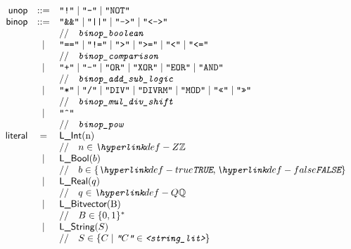 \documentclass{book}
\begin{document}
\[
\begin{array}{rcl}
\unop &::=& \texttt{"!"} \;|\; \texttt{"-"} \;|\; \texttt{"NOT"} \\
\binop &::=& \texttt{"\&\&"} \;|\; \texttt{"||"} \;|\; \texttt{"-->"} \;|\;  \texttt{"<->"}  \\
 & & \ASTComment{\texttt{binop\_boolean}}\\

 &|& \texttt{"=="} \;|\; \texttt{"!="}  \;|\; \texttt{">"}  \;|\; \texttt{">="} \;|\; \texttt{"<"} \;|\; \texttt{"<="}   \\
 & & \ASTComment{\texttt{binop\_comparison}}\\

 &|& \texttt{"+"} \;|\; \texttt{"-"}  \;|\; \texttt{"OR"}  \;|\; \texttt{"XOR"} \;|\; \texttt{"EOR"} \;|\; \texttt{"AND"}   \\
 & & \ASTComment{\texttt{binop\_add\_sub\_logic}}\\

 &|& \texttt{"*"} \;|\; \texttt{"/"}  \;|\; \texttt{"DIV"}  \;|\; \texttt{"DIVRM"} \;|\; \texttt{"MOD"}  \;|\; \texttt{"<<"}  \;|\; \texttt{">>"}    \\
 & & \ASTComment{\texttt{binop\_mul\_div\_shift}}\\

 &|& \texttt{"\^{}"}   \\
 & & \ASTComment{\texttt{binop\_pow}}\\


\literal &=& \lint($n$) \\
 & & \ASTComment{$n \in \Z$}\\
 &|& \lbool(b) \\
 & & \ASTComment{$b \in \{\True, \False\}$}\\
 &|& \lreal(q)  \\
 & & \ASTComment{$q \in \Q$}\\
 &|& \lbitvector($B$)   \\
 & & \ASTComment{$B \in \{0, 1\}^*$}\\
 &|& \lstring(S)\\
 & & \ASTComment{$S \in \{C \;|\; \texttt{"$C$"} \in \texttt{<string\_lit>}\} $}\\
\end{array}
\]
\end{document}
